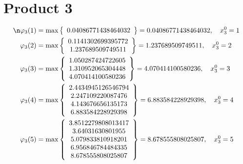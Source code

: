 \documentclass{article}
\begin{document}
\section{Product 3}
\begin{align*}
\n  
  
\varphi_{3}(1) &= \max \left\{ \begin{array}{c}
0.04086771438464032
\end{array} \right\} = 0.04086771438464032, \quad x_{3}^0 = 1\\
  
  
  
  
\varphi_{3}(2) &= \max \left\{ \begin{array}{c}
0.1141302699395772 \\
 1.237689509749511
\end{array} \right\} = 1.237689509749511, \quad x_{3}^0 = 2\\
  
  
  
  
\varphi_{3}(3) &= \max \left\{ \begin{array}{c}
1.050287424722605 \\
 1.310952065304448 \\
 4.070414100580236
\end{array} \right\} = 4.070414100580236, \quad x_{3}^0 = 3\\
  
  
  
  
\varphi_{3}(4) &= \max \left\{ \begin{array}{c}
2.4434945126546794 \\
 2.247109220087476 \\
 4.143676656135173 \\
 6.883584228929398
\end{array} \right\} = 6.883584228929398, \quad x_{3}^0 = 4\\
  
  
  
  
\varphi_{3}(5) &= \max \left\{ \begin{array}{c}
3.8512279808013417 \\
 3.64031630801955 \\
 5.079833810918201 \\
 6.956846784484335 \\
 8.678555808025807
\end{array} \right\} = 8.678555808025807, \quad x_{3}^0 = 5\\
  
  
  

\end{align*}
\end{document}
